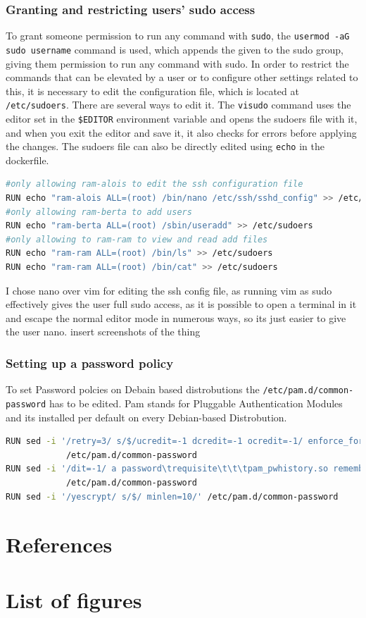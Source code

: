 \documentclass[a4paper]{article}
\newcommand{\abc}{\hfill \break}
\begin{document}
\subsubsection{Granting and restricting users' sudo access}
To grant someone permission to run any command with \texttt{sudo}, the \texttt{usermod -aG sudo username} command is used, which appends the given to the sudo group, giving them permission to run any command with sudo. \abc
In order to restrict the commands that can be elevated by a user or to configure other settings related to this, it is necessary to edit the configuration file, which is located at \texttt{/etc/sudoers}.\abc
There are several ways to edit it. The \texttt{visudo} command uses the editor set in the \texttt{\$EDITOR} environment variable and opens the sudoers file with it, and when you exit the editor and save it, it also checks for errors before applying the changes.
The sudoers file can also be directly edited using \texttt{echo} in the dockerfile.
\begin{lstlisting}[language=bash]
#only allowing ram-alois to edit the ssh configuration file
RUN echo "ram-alois ALL=(root) /bin/nano /etc/ssh/sshd_config" >> /etc/sudoers
#only allowing ram-berta to add users
RUN echo "ram-berta ALL=(root) /sbin/useradd" >> /etc/sudoers
#only allowing to ram-ram to view and read add files
RUN echo "ram-ram ALL=(root) /bin/ls" >> /etc/sudoers
RUN echo "ram-ram ALL=(root) /bin/cat" >> /etc/sudoers
\end{lstlisting}
I chose nano over vim for editing the ssh config file, as running vim as sudo effectively gives the user full sudo access, as it is possible to open a terminal in it and escape the normal editor mode in numerous ways, so its just easier to give the user nano.\abc
insert screenshots of the thing
\subsubsection{Setting up a password policy}
To set Password polcies on Debain based distrobutions the \texttt{/etc/pam.d/common-password} has to be edited. Pam stands for Pluggable Authentication Modules and its installed per default on every Debian-based Distrobution.\cite{password-policies-1}
\begin{lstlisting}[language=bash]
RUN sed -i '/retry=3/ s/$/ucredit=-1 dcredit=-1 ocredit=-1/ enforce_for_root'\
            /etc/pam.d/common-password
RUN sed -i '/dit=-1/ a password\trequisite\t\t\tpam_pwhistory.so remember=5 use_authtok'\
            /etc/pam.d/common-password
RUN sed -i '/yescrypt/ s/$/ minlen=10/' /etc/pam.d/common-password
\end{lstlisting}

\newpage
\section{References}

\newpage
\section{List of figures}

\listoffigures
\end{document}
